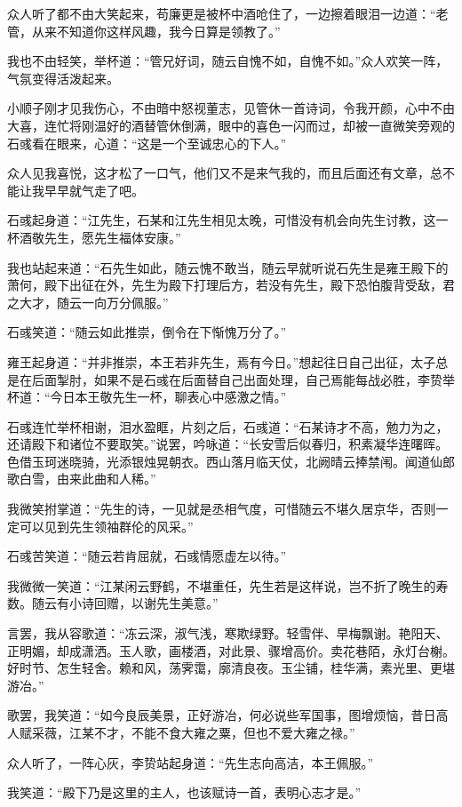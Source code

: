 众人听了都不由大笑起来，苟廉更是被杯中酒呛住了，一边擦着眼泪一边道：“老管，从来不知道你这样风趣，我今日算是领教了。”

我也不由轻笑，举杯道：“管兄好词，随云自愧不如，自愧不如。”众人欢笑一阵，气氛变得活泼起来。

小顺子刚才见我伤心，不由暗中怒视董志，见管休一首诗词，令我开颜，心中不由大喜，连忙将刚温好的酒替管休倒满，眼中的喜色一闪而过，却被一直微笑旁观的石彧看在眼来，心道：“这是一个至诚忠心的下人。”

众人见我喜悦，这才松了一口气，他们又不是来气我的，而且后面还有文章，总不能让我早早就气走了吧。

石彧起身道：“江先生，石某和江先生相见太晚，可惜没有机会向先生讨教，这一杯酒敬先生，愿先生福体安康。”

我也站起来道：“石先生如此，随云愧不敢当，随云早就听说石先生是雍王殿下的萧何，殿下出征在外，先生为殿下打理后方，若没有先生，殿下恐怕腹背受敌，君之大才，随云一向万分佩服。”

石彧笑道：“随云如此推崇，倒令在下惭愧万分了。”

雍王起身道：“并非推崇，本王若非先生，焉有今日。”想起往日自己出征，太子总是在后面掣肘，如果不是石彧在后面替自己出面处理，自己焉能每战必胜，李贽举杯道：“今日本王敬先生一杯，聊表心中感激之情。”

石彧连忙举杯相谢，泪水盈眶，片刻之后，石彧道：“石某诗才不高，勉力为之，还请殿下和诸位不要取笑。”说罢，吟咏道：“长安雪后似春归，积素凝华连曙晖。色借玉珂迷晓骑，光添银烛晃朝衣。西山落月临天仗，北阙晴云捧禁闱。闻道仙郎歌白雪，由来此曲和人稀。”

我微笑拊掌道：“先生的诗，一见就是丞相气度，可惜随云不堪久居京华，否则一定可以见到先生领袖群伦的风采。”

石彧苦笑道：“随云若肯屈就，石彧情愿虚左以待。”

我微微一笑道：“江某闲云野鹤，不堪重任，先生若是这样说，岂不折了晚生的寿数。随云有小诗回赠，以谢先生美意。”

言罢，我从容歌道：“冻云深，淑气浅，寒欺绿野。轻雪伴、早梅飘谢。艳阳天、正明媚，却成潇洒。玉人歌，画楼酒，对此景、骤增高价。卖花巷陌，永灯台榭。好时节、怎生轻舍。赖和风，荡霁霭，廓清良夜。玉尘铺，桂华满，素光里、更堪游冶。”

歌罢，我笑道：“如今良辰美景，正好游冶，何必说些军国事，图增烦恼，昔日高人赋采薇，江某不才，不能不食大雍之粟，但也不爱大雍之禄。”

众人听了，一阵心灰，李贽站起身道：“先生志向高洁，本王佩服。”

我笑道：“殿下乃是这里的主人，也该赋诗一首，表明心志才是。”

